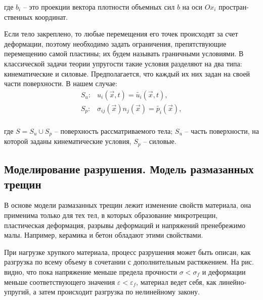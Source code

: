 \documentclass[12pt,a4paper]{article}
\begin{document}
  \noindent где $b_i$ -- это проекции вектора плотности объемных сил $b$ на оси $Ox_i$ простран- ственных координат.

  Если тело закреплено, то любые перемещения его точек происходят за счет деформации, поэтому необходимо задать ограничения, препятствующие перемещению самой пластины; их будем называть граничными условиями. В классической задачи теории упругости такие условия разделяют на два типа: кинематические и силовые. Предполагается, что каждый их них задан на своей части поверхности. В нашем случае:
  \[
    \begin{split}
      S_u\colon& u_i(\vec x, t) = \widetilde{u_i}(\vec x, t), \\
      S_p\colon& \sigma_{ij}(\vec x) n_j(\vec x)  = \widetilde{p_i}(\vec x),  \\
    \end{split}
  \]

  \noindent где $S = S_u \cup S_p$ -- поверхность рассматриваемого тела; $S_u$ -- часть поверхности, на которой заданы кинематические условия, $S_p$ -- силовые.
  
  \subsection{Моделирование разрушения. Модель размазанных трещин}

  В основе модели размазанных трещин лежит изменение свойств материала, она применима только для тех тел, в которых образование микротрещин, пластическая деформация, разрывы деформаций и напряжений пренебрежимо малы. Например, керамика и бетон обладают этими свойствами.
  
  При нагрузке хрупкого материала, процесс разрушения может быть описан, как разгрузка по всему объему в сочетании с дополнительным растяжением. На рис.  видно, что пока напряжение меньше предела прочности $\sigma < \sigma_f$  и деформации меньше соответствующего значения $\varepsilon < \varepsilon_f$, материал ведет себя, как линейно-упругий, а затем происходит разгрузка по нелинейному закону.
\end{document}
